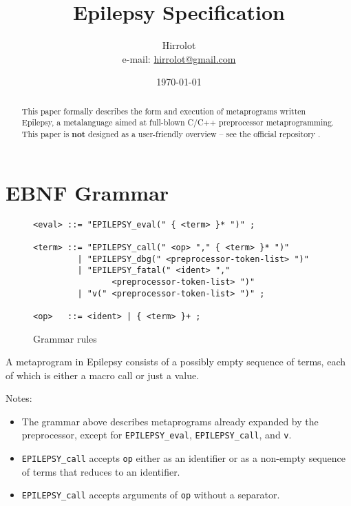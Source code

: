 \documentclass[12pt]{article}
\theoremstyle{break}
\begin{document}
\title{Epilepsy Specification}
\date{\today}
\author{Hirrolot \\ e-mail: \href{mailto:hirrolot@gmail.com}{hirrolot@gmail.com}}
\maketitle

\begin{abstract}
This paper formally describes the form and execution of metaprograms written
Epilepsy, a metalanguage aimed at full-blown C/C++ preprocessor metaprogramming. This paper
is \textbf{not} designed as a user-friendly overview -- see the official repository
\cite{Epilepsy}.
\end{abstract}

\tableofcontents

\newpage

\section{EBNF Grammar}

\begin{figure}[H]
    \caption{Grammar rules}

\begin{verbatim}
<eval> ::= "EPILEPSY_eval(" { <term> }* ")" ;

<term> ::= "EPILEPSY_call(" <op> "," { <term> }* ")"
         | "EPILEPSY_dbg(" <preprocessor-token-list> ")"
         | "EPILEPSY_fatal(" <ident> ","
                <preprocessor-token-list> ")"
         | "v(" <preprocessor-token-list> ")" ;

<op>   ::= <ident> | { <term> }+ ;
\end{verbatim}

\end{figure}

A metaprogram in Epilepsy consists of a possibly empty sequence of terms, each of which
is either a macro call or just a value.

Notes:

\begin{itemize}
    \item The grammar above describes metaprograms already expanded by the preprocessor,
    except for \texttt{EPILEPSY\_eval}, \texttt{EPILEPSY\_call}, and \texttt{v}.
    \item \texttt{EPILEPSY\_call} accepts \texttt{op} either as an identifier or as a non-empty
    sequence of terms that reduces to an identifier.
    \item \texttt{EPILEPSY\_call} accepts arguments of \texttt{op} without a separator.
\end{itemize}
\end{document}
